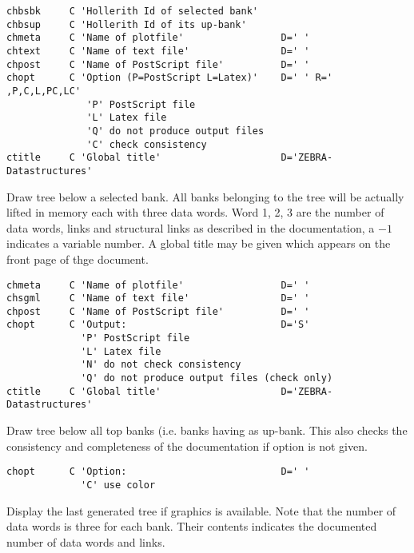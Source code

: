  
\begin{verbatim}
chbsbk     C 'Hollerith Id of selected bank'
chbsup     C 'Hollerith Id of its up-bank'
chmeta     C 'Name of plotfile'                 D=' '
chtext     C 'Name of text file'                D=' '
chpost     C 'Name of PostScript file'          D=' '
chopt      C 'Option (P=PostScript L=Latex)'    D=' ' R=' ,P,C,L,PC,LC'
              'P' PostScript file
              'L' Latex file
              'Q' do not produce output files
              'C' check consistency
ctitle     C 'Global title'                     D='ZEBRA-Datastructures'
\end{verbatim}
 
Draw tree below a selected bank. 
All banks belonging to the tree will be
actually lifted in memory each with three data words. 
Word 1, 2, 3 are the number of data words, links and structural links
as described in the documentation, a $-1$ indicates a variable number.
A global title may be given which appears on the front page of
thge document.
 
 
\begin{verbatim}
chmeta     C 'Name of plotfile'                 D=' '
chsgml     C 'Name of text file'                D=' '
chpost     C 'Name of PostScript file'          D=' '
chopt      C 'Output:                           D='S'
             'P' PostScript file
             'L' Latex file
             'N' do not check consistency
             'Q' do not produce output files (check only)
ctitle     C 'Global title'                     D='ZEBRA-Datastructures'
\end{verbatim}
 
Draw tree below all top banks (i.e. banks having  as
up-bank. This also checks the consistency and completeness
of the documentation if option  is not given.
 
\begin{verbatim}
chopt      C 'Option:                           D=' ' 
             'C' use color
\end{verbatim}
 
Display the last generated tree if graphics is available. 
Note that the number of data words is three for each bank. 
Their
contents indicates the documented number of data words and links.
 
